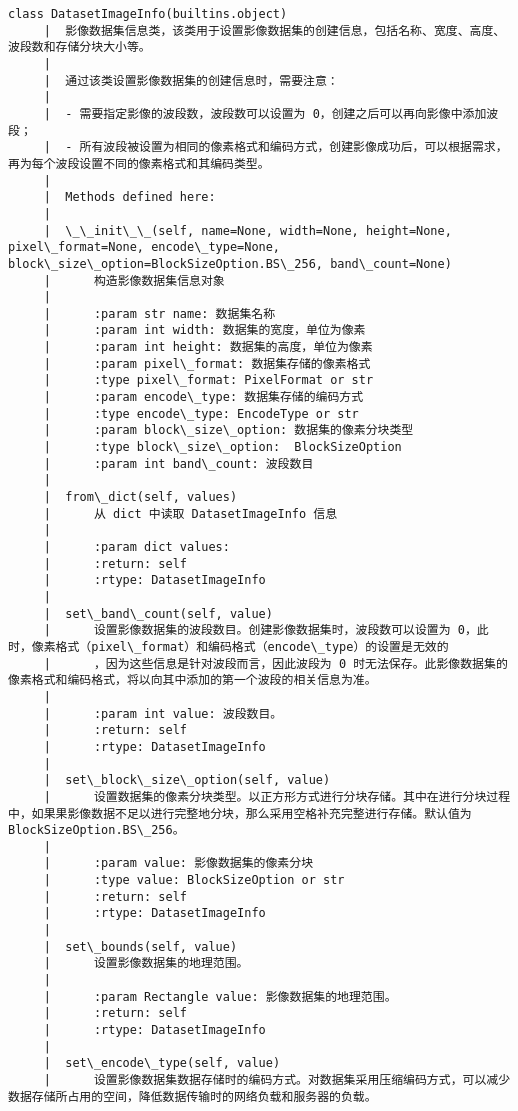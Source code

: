 \documentclass[11pt]{article}
\begin{document}
\begin{Verbatim}[commandchars=\\\{\}]
    class DatasetImageInfo(builtins.object)
     |  影像数据集信息类，该类用于设置影像数据集的创建信息，包括名称、宽度、高度、波段数和存储分块大小等。
     |  
     |  通过该类设置影像数据集的创建信息时，需要注意：
     |  
     |  - 需要指定影像的波段数，波段数可以设置为 0，创建之后可以再向影像中添加波段；
     |  - 所有波段被设置为相同的像素格式和编码方式，创建影像成功后，可以根据需求，再为每个波段设置不同的像素格式和其编码类型。
     |  
     |  Methods defined here:
     |  
     |  \_\_init\_\_(self, name=None, width=None, height=None, pixel\_format=None, encode\_type=None, block\_size\_option=BlockSizeOption.BS\_256, band\_count=None)
     |      构造影像数据集信息对象
     |      
     |      :param str name: 数据集名称
     |      :param int width: 数据集的宽度，单位为像素
     |      :param int height: 数据集的高度，单位为像素
     |      :param pixel\_format: 数据集存储的像素格式
     |      :type pixel\_format: PixelFormat or str
     |      :param encode\_type: 数据集存储的编码方式
     |      :type encode\_type: EncodeType or str
     |      :param block\_size\_option: 数据集的像素分块类型
     |      :type block\_size\_option:  BlockSizeOption
     |      :param int band\_count: 波段数目
     |  
     |  from\_dict(self, values)
     |      从 dict 中读取 DatasetImageInfo 信息
     |      
     |      :param dict values:
     |      :return: self
     |      :rtype: DatasetImageInfo
     |  
     |  set\_band\_count(self, value)
     |      设置影像数据集的波段数目。创建影像数据集时，波段数可以设置为 0，此时，像素格式（pixel\_format）和编码格式（encode\_type）的设置是无效的
     |      ，因为这些信息是针对波段而言，因此波段为 0 时无法保存。此影像数据集的像素格式和编码格式，将以向其中添加的第一个波段的相关信息为准。
     |      
     |      :param int value: 波段数目。
     |      :return: self
     |      :rtype: DatasetImageInfo
     |  
     |  set\_block\_size\_option(self, value)
     |      设置数据集的像素分块类型。以正方形方式进行分块存储。其中在进行分块过程中，如果果影像数据不足以进行完整地分块，那么采用空格补充完整进行存储。默认值为 BlockSizeOption.BS\_256。
     |      
     |      :param value: 影像数据集的像素分块
     |      :type value: BlockSizeOption or str
     |      :return: self
     |      :rtype: DatasetImageInfo
     |  
     |  set\_bounds(self, value)
     |      设置影像数据集的地理范围。
     |      
     |      :param Rectangle value: 影像数据集的地理范围。
     |      :return: self
     |      :rtype: DatasetImageInfo
     |  
     |  set\_encode\_type(self, value)
     |      设置影像数据集数据存储时的编码方式。对数据集采用压缩编码方式，可以减少数据存储所占用的空间，降低数据传输时的网络负载和服务器的负载。

\end{Verbatim}
\end{document}
